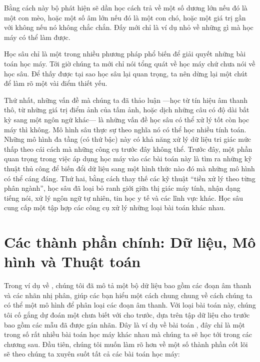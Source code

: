 \documentclass[letterpaper,11pt,english]{sphinxmanual}
\begin{document}
Bằng cách này bộ phát hiện sẽ dần học cách trả về một số dương lớn nếu
đó là một con mèo, hoặc một số âm lớn nếu đó là một con chó, hoặc một
giá trị gần với không nếu nó không chắc chắn. Đấy mới chỉ là ví dụ nhỏ
về những gì mà học máy có thể làm được.



Học sâu chỉ là một trong nhiều phương pháp phổ biến để giải quyết những
bài toán học máy. Tới giờ chúng ta mới chỉ nói tổng quát về học máy chứ
chưa nói về học sâu. Để thấy được tại sao học sâu lại quan trọng, ta nên
dừng lại một chút để làm rõ một vài điểm thiết yếu.



Thứ nhất, những vấn đề mà chúng ta đã thảo luận —học từ tín hiệu âm
thanh thô, từ những giá trị điểm ảnh của tấm ảnh, hoặc dịch những câu có
độ dài bất kỳ sang một ngôn ngữ khác— là những vấn đề học sâu có thể xử
lý tốt còn học máy thì không. Mô hình sâu thực sự  theo nghĩa nó có
thể học nhiều  tính toán. Những mô hình đa tầng (có thứ bậc) này
có khả năng xử lý dữ liệu tri giác mức thấp theo cái cách mà những công
cụ trước đây không thể. Trước đây, một phần quan trọng trong việc áp
dụng học máy vào các bài toán này là tìm ra những kỹ thuật thủ công để
biến đổi dữ liệu sang một hình thức nào đó mà những mô hình  có
thể cáng đáng. Thứ hai, bằng cách thay thế các kỹ thuật “tiền xử lý theo
từng phân ngành”, học sâu đã loại bỏ ranh giới giữa thị giác máy tính,
nhận dạng tiếng nói, xử lý ngôn ngữ tự nhiên, tin học y tế và các lĩnh
vực khác. Học sâu cung cấp một tập hợp các công cụ xử lý những loại bài
toán khác nhau.








\section{Các thành phần chính: Dữ liệu, Mô hình và Thuật toán}
\label{\detokenize{chapter_introduction/index_vn:cac-thanh-phan-chinh-du-lieu-mo-hinh-va-thuat-toan}}


Trong ví dụ về , chúng tôi đã mô tả một bộ dữ liệu bao gồm
các đoạn âm thanh và các nhãn nhị phân, giúp các bạn hiểu một cách chung
chung về cách chúng ta có thể  một mô hình để phân loại các
đoạn âm thanh. Với loại bài toán này, chúng tôi cố gắng dự đoán một
 chưa biết với  cho trước, dựa trên tập dữ liệu cho trước
bao gồm các mẫu đã được gán nhãn. Đây là ví dụ về bài toán , đây chỉ là một trong số rất nhiều  bài toán học máy khác
nhau mà chúng ta sẽ học tới trong các chương sau. Đầu tiên, chúng tôi
muốn làm rõ hơn về một số thành phần cốt lõi sẽ theo chúng ta xuyên suốt
tất cả các bài toán học máy:
\end{document}
